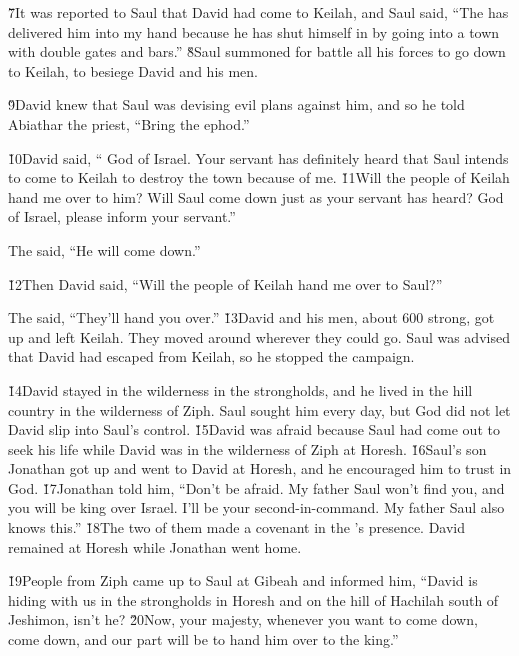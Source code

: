 \v{7}It was reported to Saul that David had come to Keilah, and Saul said, ``The  has delivered him into my hand because he has shut himself in by going into a town with double gates and bars.'' \v{8}Saul summoned for battle all his forces to go down to Keilah, to besiege David and his men.

\v{9}David knew that Saul was devising evil plans against him, and so he told Abiathar the priest, ``Bring the ephod.''

\v{10}David said, `` God of Israel. Your servant has definitely heard that Saul intends to come to Keilah to destroy the town because of me. \v{11}Will the people of Keilah hand me over to him? Will Saul come down just as your servant has heard?  God of Israel, please inform your servant.''

The  said, ``He will come down.''

\v{12}Then David said, ``Will the people of Keilah hand me over to Saul?''

The  said, ``They'll hand you over.'' \v{13}David and his men, about 600 strong, got up and left Keilah. They moved around wherever they could go. Saul was advised that David had escaped from Keilah, so he stopped the campaign.

\v{14}David stayed in the wilderness in the strongholds, and he lived in the hill country in the wilderness of Ziph. Saul sought him every day, but God did not let David slip into Saul's control. \v{15}David was afraid because Saul had come out to seek his life while David was in the wilderness of Ziph at Horesh. \v{16}Saul's son Jonathan got up and went to David at Horesh, and he encouraged him to trust in God. \v{17}Jonathan told him, ``Don't be afraid. My father Saul won't find you, and you will be king over Israel. I'll be your second-in-command. My father Saul also knows this.'' \v{18}The two of them made a covenant in the 's presence. David remained at Horesh while Jonathan went home.

\v{19}People from Ziph came up to Saul at Gibeah and informed him, ``David is hiding with us in the strongholds in Horesh and on the hill of Hachilah south of Jeshimon, isn't he? \v{20}Now, your majesty, whenever you want to come down, come down, and our part will be to hand him over to the king.''

